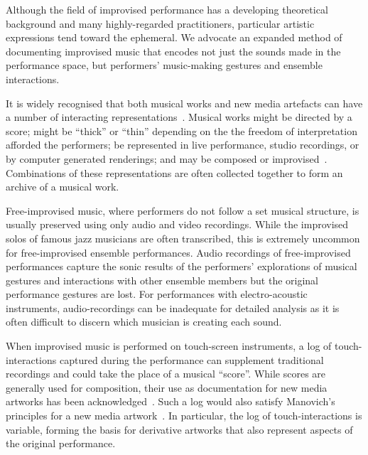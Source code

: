 \documentclass[graybox]{svmult}
\begin{document}
Although the field of improvised performance has a developing
theoretical background and many highly-regarded practitioners,
particular artistic expressions tend toward the ephemeral. We advocate
an expanded method of documenting improvised music that encodes not
just the sounds made in the performance space, but performers'
music-making gestures and ensemble interactions.

It is widely recognised that both musical works and new media
artefacts can have a number of interacting
representations~\cite{Rinehart:2007pi}. Musical works might be
directed by a score; might be ``thick'' or ``thin'' depending on the
the freedom of interpretation afforded the performers; be represented
in live performance, studio recordings, or by computer generated
renderings; and may be composed or improvised~\cite{Davies:2005fj}.
Combinations of these representations are often collected together to
form an archive of a musical work.

Free-improvised music, where performers do not follow a set musical
structure, is usually preserved using only audio and video recordings.
While the improvised solos of famous jazz musicians are often
transcribed, this is extremely uncommon for free-improvised ensemble
performances. Audio recordings of free-improvised performances capture
the sonic results of the performers' explorations of musical gestures
and interactions with other ensemble members but the original
performance gestures are lost. For performances with electro-acoustic
instruments, audio-recordings can be inadequate for detailed analysis
as it is often difficult to discern which musician is creating each
sound.

When improvised music is performed on touch-screen instruments, a log
of touch-interactions captured during the performance can supplement
traditional recordings and could take the place of a musical
``score''. While scores are generally used for composition, their use
as documentation for new media artworks has been
acknowledged~\cite{MacDonald:2009ve}. Such a log would also satisfy
Manovich's principles for a new media artwork~\cite{Manovich:2002ly}.
In particular, the log of touch-interactions is variable, forming the
basis for derivative artworks that also represent aspects of the
original performance.
\end{document}
